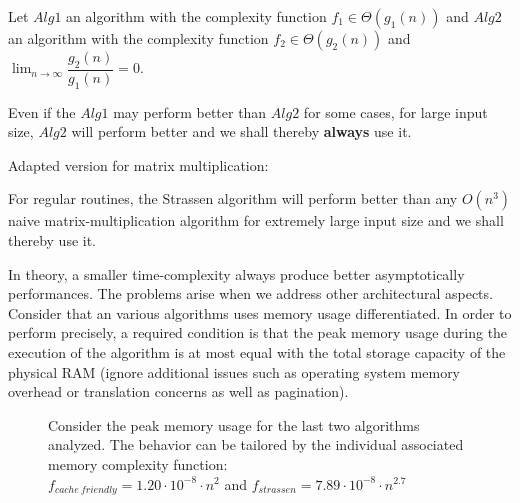 \begin{pitfall}
Let $Alg1$ an algorithm with the complexity function $f_{1} \in \Theta(g_1(n))$  and $Alg2$ an algorithm with the complexity function $f_{2} \in \Theta(g_2(n))$ and $\lim_{n\to\infty} \dfrac{g_2(n)}{g_1(n)} = 0$.

Even if the $Alg1$ may perform better than $Alg2$ for some cases, for large input size, $Alg2$ will perform better and we shall thereby \textbf{always} use it.
\end{pitfall}

\begin{pitfall}
Adapted version for matrix multiplication: 

For regular routines, the Strassen algorithm will perform better than any $O(n^3)$ naive matrix-multiplication algorithm for extremely large input size and we shall thereby use it.
\end{pitfall}

In theory, a smaller time-complexity always produce better asymptotically performances. The problems arise when we address other architectural aspects. Consider that an various algorithms uses memory usage differentiated. In order to perform precisely, a required condition is that the peak memory usage during the execution of the algorithm is at most equal with the total storage capacity of the physical RAM (ignore additional issues such as operating system memory overhead or translation concerns as well as pagination). 


\begin{figure}[H]
\caption{ Consider the peak memory usage for the last two algorithms analyzed. The behavior can be tailored by the individual associated memory complexity function: \\ $f_{cache\ friendly} = 1.20 \cdot 10^{-8} \cdot n^2 $ and  $f_{strassen} = 7.89 \cdot 10^{-8} \cdot n^{2.7} $ } 
\end{figure}


